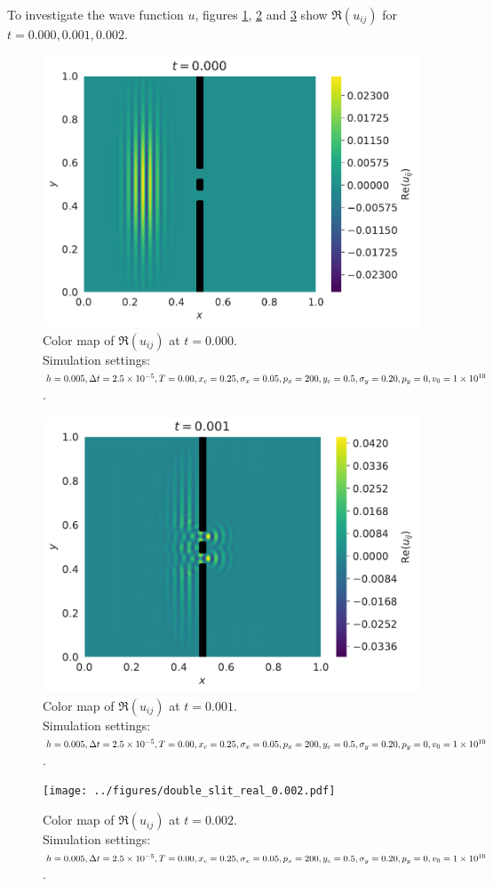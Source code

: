 \documentclass[english,notitlepage,reprint,nofootinbib]{revtex4-1}  %
\begin{document}
To investigate the wave function $u$, figures \ref{fig:double_slit_real_0.000}, \ref{fig:double_slit_real_0.001} and \ref{fig:double_slit_real_0.002} show $\Re(u_{ij})$ for $t=0.000, 0.001, 0.002$.
\begin{figure}[H]
    \centering
    \includegraphics[width=.5\textwidth]{../figures/double_slit_real_0.000.pdf}
    \caption{Color map of $\Re (u_{ij})$ at $t = 0.000$. \\Simulation settings: $h = 0.005, \Delta t = 2.5 \times 10^{-5}, \\T = 0.00, x_c = 0.25, \sigma_x = 0.05, p_x = 200, y_c = 0.5, \\\sigma_y = 0.20, p_y = 0, v_0 = 1 \times 10^{10}$.}
    \label{fig:double_slit_real_0.000}
\end{figure}
\begin{figure}[H]
    \centering
    \includegraphics[width=.5\textwidth]{../figures/double_slit_real_0.001.pdf}
    \caption{Color map of $\Re (u_{ij})$ at $t = 0.001$.  \\Simulation settings: $h = 0.005, \Delta t = 2.5 \times 10^{-5}, \\T = 0.00, x_c = 0.25, \sigma_x = 0.05, p_x = 200, y_c = 0.5, \\\sigma_y = 0.20, p_y = 0, v_0 = 1 \times 10^{10}$.}
    \label{fig:double_slit_real_0.001}
\end{figure}
\begin{figure}[H]
    \centering
    \texttt{[image: ../figures/double\_slit\_real\_0.002.pdf]}
    \caption{Color map of $\Re (u_{ij})$ at $t = 0.002$.  \\Simulation settings: $h = 0.005, \Delta t = 2.5 \times 10^{-5}, \\T = 0.00, x_c = 0.25, \sigma_x = 0.05, p_x = 200, y_c = 0.5, \\\sigma_y = 0.20, p_y = 0, v_0 = 1 \times 10^{10}$.}
    \label{fig:double_slit_real_0.002}
\end{figure}
\end{document}
